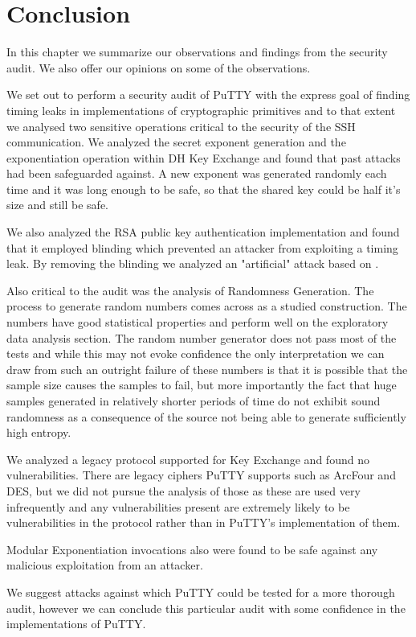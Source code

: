 \documentclass{bhamthesis}
\begin{document}
\chapter{Conclusion}
In this chapter we summarize our observations and findings from the security audit. We also offer our opinions on some of the observations.\par
We set out to perform a security audit of PuTTY with the express goal of finding timing leaks in implementations of cryptographic primitives and to that extent we analysed two sensitive operations critical to the security of the SSH communication. We analyzed the secret exponent generation and the exponentiation operation within DH Key Exchange and found that past attacks \cite{kocher96,oorschot96} had been safeguarded against. A new exponent was generated randomly each time and it was long enough to be safe, so that the shared key could be half it's size and still be safe.\par
We also analyzed the RSA public key authentication implementation and found that it employed blinding which prevented an attacker from exploiting a timing leak. By removing the blinding we analyzed an "artificial" attack based on \cite{brumley}. \par 
Also critical to the audit was the analysis of Randomness Generation. The process to generate random numbers comes across as a studied construction. The numbers have good statistical properties and perform well on the exploratory data analysis section. The random number generator does not pass most of the tests and while this may not evoke confidence the only interpretation we can draw from such an outright failure of these numbers is that it is possible that the sample size causes the samples to fail, but more importantly the fact that huge samples generated in relatively shorter periods of time do not exhibit sound randomness as a consequence of the source not being able to generate sufficiently high entropy.\par
We analyzed a legacy protocol supported for Key Exchange and found no vulnerabilities. There are legacy ciphers PuTTY supports such as ArcFour and DES, but we did not pursue the analysis of those as these are used very infrequently and any vulnerabilities present are extremely likely to be vulnerabilities in the protocol rather than in PuTTY's implementation of them.\par
Modular Exponentiation invocations also were found to be safe against any malicious exploitation from an attacker.\par
We suggest attacks against which PuTTY could be tested for a more thorough audit, however we can conclude this particular audit with some confidence in the implementations of PuTTY.
\end{document}
